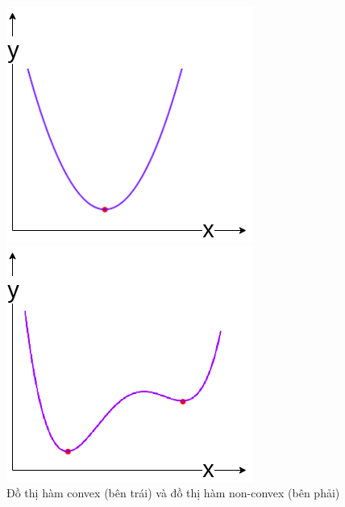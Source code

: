 \begin{figure}[!htb]
   \begin{minipage}{0.48\textwidth}
     \centering
     \includegraphics[width=1\linewidth]{books/artificial-neural-network/chapter02/figure/convex.png}
   \end{minipage}\hfill
   \begin{minipage}{0.48\textwidth}
     \centering
     \includegraphics[width=1\linewidth]{books/artificial-neural-network/chapter02/figure/non_convex.png}
   \end{minipage}
   \caption{Đồ thị hàm convex (bên trái) và đồ thị hàm non-convex (bên phải)}
   \label{fig:convex}
\end{figure}


